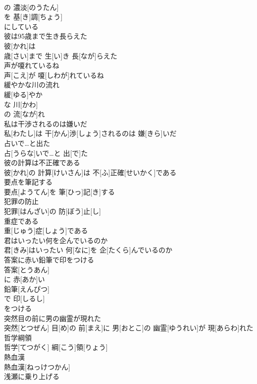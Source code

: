 \documentclass[8pt]{extreport}
\begin{document}
\begin{CJK}{UTF8}{min}
\\	の 濃淡[のうたん]
\\	を 基[き]調[ちょう]
\\	にしている
\\	彼は95歳まで生き長らえた	
\\	彼[かれ]は 
\\	歳[さい]まで 生[い]き 長[なが]らえた
\\	声が嗄れているね	
\\	声[こえ]が 嗄[しわが]れているね
\\	緩やかな川の流れ	
\\	緩[ゆる]やか 
\\	な 川[かわ]
\\	の 流[なが]れ 
\\	私は干渉されるのは嫌いだ	
\\	私[わたし]は 干[かん]渉[しょう]されるのは 嫌[きら]いだ
\\	占いで…と出た	
\\	占[うらな]いで…と 出[で]た
\\	彼の計算は不正確である	
\\	彼[かれ]の 計算[けいさん]は 不[ふ]正確[せいかく]である
\\	要点を筆記する	
\\	要点[ようてん]を 筆[ひっ]記[き]する
\\	犯罪の防止	
\\	犯罪[はんざい]の 防[ぼう]止[し]
\\	重症である	
\\	重[じゅう]症[しょう]である
\\	君はいったい何を企んでいるのか	
\\	君[きみ]はいったい 何[なに]を 企[たくら]んでいるのか
\\	答案に赤い鉛筆で印をつける	
\\	答案[とうあん]
\\	に 赤[あか]い 
\\	鉛筆[えんぴつ]
\\	で 印[しるし]
\\	をつける 
\\	突然目の前に男の幽霊が現れた	
\\	突然[とつぜん] 目[め]の 前[まえ]に 男[おとこ]の 幽霊[ゆうれい]が 現[あらわ]れた
\\	哲学綱領	
\\	哲学[てつがく] 綱[こう]領[りょう]
\\	熱血漢	
\\	熱血漢[ねっけつかん]
\\	浅瀬に乗り上げる	

\end{CJK}
\end{document}

